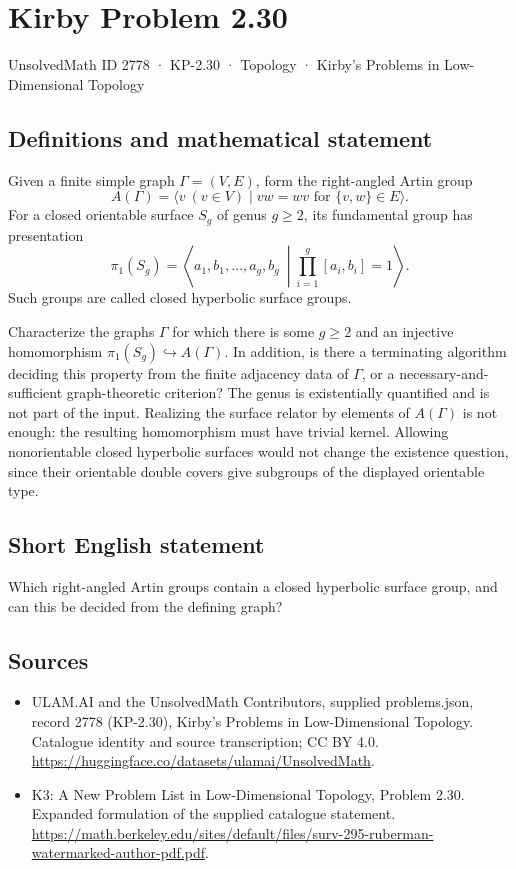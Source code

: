 \documentclass[11pt,a4paper]{article}
\begin{document}
\section*{Kirby Problem 2.30}\label{2778}
{\small UnsolvedMath ID 2778 · KP-2.30 · Topology · Kirby's Problems in Low-Dimensional Topology}
\subsection{Definitions and mathematical statement}
Given a finite simple graph $\Gamma=(V,E)$, form the right-angled Artin group
\[
A(\Gamma)=\langle v\ (v\in V)\mid vw=wv\text{ for }\{v,w\}\in E\rangle.
\]
For a closed orientable surface $S_g$ of genus $g\geq2$, its fundamental group
has presentation
\[
\pi_1(S_g)=\left\langle a_1,b_1,\ldots,a_g,b_g\ \middle|
\prod_{i=1}^g[a_i,b_i]=1\right\rangle.
\]
Such groups are called closed hyperbolic surface groups.

Characterize the graphs $\Gamma$ for which there is some $g\geq2$ and an
injective homomorphism $\pi_1(S_g)\hookrightarrow A(\Gamma)$.
In addition, is there a terminating algorithm deciding this property from
the finite adjacency data of $\Gamma$, or a necessary-and-sufficient
graph-theoretic criterion?
The genus is existentially quantified and is not part of the input. Realizing
the surface relator by elements of $A(\Gamma)$ is not enough: the resulting
homomorphism must have trivial kernel. Allowing nonorientable closed hyperbolic
surfaces would not change the existence question, since their orientable double
covers give subgroups of the displayed orientable type.
\subsection{Short English statement}
Which right-angled Artin groups contain a closed hyperbolic surface group, and can this be decided from the defining graph?
\subsection{Sources}
\begin{itemize}
\item[S1] ULAM.AI and the UnsolvedMath Contributors, supplied problems.json, record 2778 (KP-2.30), Kirby's Problems in Low-Dimensional Topology. Catalogue identity and source transcription; CC BY 4.0.
\url{https://huggingface.co/datasets/ulamai/UnsolvedMath}.
\item[S2] K3: A New Problem List in Low-Dimensional Topology, Problem 2.30. Expanded formulation of the supplied catalogue statement.
\url{https://math.berkeley.edu/sites/default/files/surv-295-ruberman-watermarked-author-pdf.pdf}.
\end{itemize}
\end{document}
